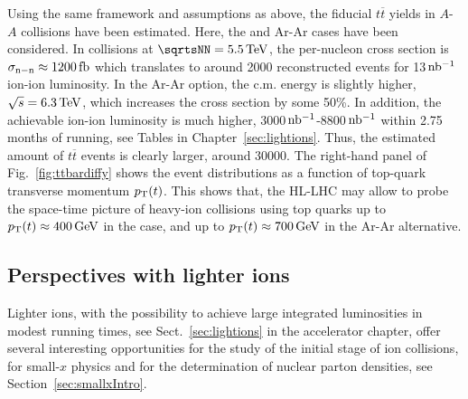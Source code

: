 \documentclass[../report.tex]{subfiles}
\begin{document}
Using the same framework and assumptions as above, the fiducial $t\overline{t}$ yields in $A$-$A$ collisions have been estimated. Here, the \PbPb and Ar-Ar cases have been considered. In \PbPb collisions at $\sqrtsNN = 5.5 \, {\rm TeV}$, the per-nucleon cross section is $\sigma_{\rm n-n} \approx 1200 \, {\rm fb}$ which translates to around 2000 reconstructed events for 13$\, \rm nb^{-1}$ ion-ion luminosity. In the Ar-Ar option, the c.m. energy is slightly higher, $\sqrt{s} = 6.3 \, {\rm TeV}$, which increases the cross section by some 50\%. In addition, the achievable ion-ion luminosity is much higher, 3000$\,\rm nb^{-1}$-8800$\,\rm nb^{-1}$ within 2.75 months of running, see Tables in Chapter~\ref{sec:lightions}. %
Thus, the estimated amount of $t\overline{t}$ events is clearly larger, around 30000. The right-hand panel of Fig.~\ref{fig:ttbardiffy} shows the event distributions as a function of top-quark transverse momentum $p\sb{\scriptstyle\mathrm{T}}(t)$. This shows that, the HL-LHC may allow to probe the space-time picture of heavy-ion collisions using top quarks \cite{Apolinario:2017sob} up to $p_{\rm T}(t) \approx 400\,{\rm GeV}$ in the \PbPb case, and up to $p_{\rm T}(t) \approx 700\,{\rm GeV}$ in the Ar-Ar alternative. 





\subsection{Perspectives with lighter ions}
\label{sec:nPDF_lightions}

Lighter ions, with the possibility to achieve large integrated luminosities in modest running times, see Sect.~\ref{sec:lightions} in the accelerator chapter, offer several interesting opportunities for the study of the initial stage of ion collisions, for small-$x$ physics and for the determination of nuclear parton densities, see Section~\ref{sec:smallxIntro}.
\end{document}
